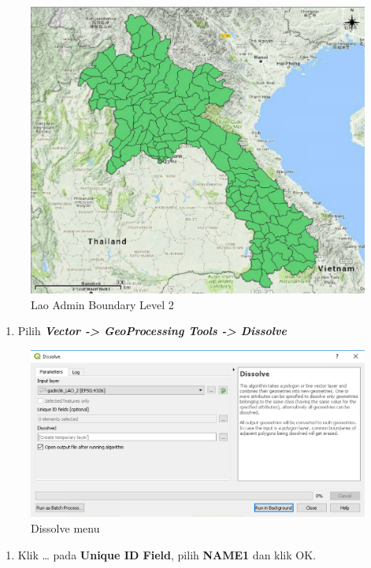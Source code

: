 \documentclass[]{book}
\providecommand{\tightlist}{%
  \setlength{\itemsep}{0pt}\setlength{\parskip}{0pt}}
\begin{document}
\begin{figure}

{\centering \includegraphics[width=0.7\linewidth]{images/04/fig19} 

}

\caption{Lao Admin Boundary Level 2}\label{fig:fig1419}
\end{figure}

\begin{enumerate}
\def\labelenumi{\arabic{enumi}.}
\setcounter{enumi}{1}
\tightlist
\item
  Pilih \textbf{\emph{Vector -\textgreater{} GeoProcessing Tools -\textgreater{} Dissolve}}
\end{enumerate}

\begin{figure}

{\centering \includegraphics[width=0.6\linewidth]{images/04/fig19a} 

}

\caption{Dissolve menu}\label{fig:fig1419a}
\end{figure}

\begin{enumerate}
\def\labelenumi{\arabic{enumi}.}
\setcounter{enumi}{2}
\tightlist
\item
  Klik \ldots{} pada \textbf{Unique ID Field}, pilih \textbf{NAME1} dan klik OK.
\end{enumerate}
\end{document}
